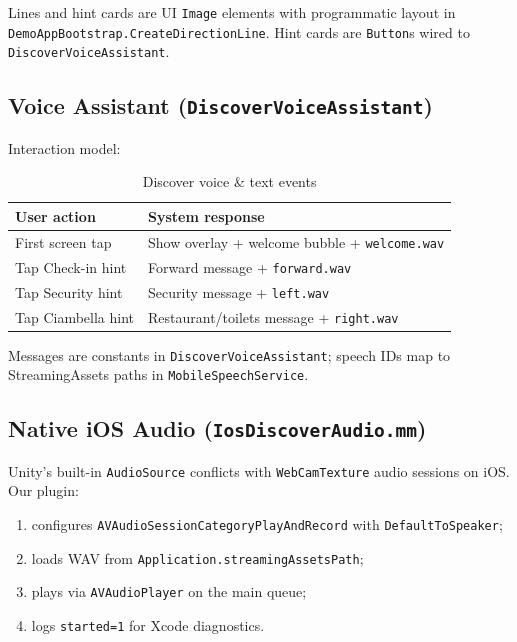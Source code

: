 \documentclass[11pt,a4paper]{article}
\begin{document}
Lines and hint cards are UI \texttt{Image} elements with programmatic layout in \texttt{DemoAppBootstrap.CreateDirectionLine}. Hint cards are \texttt{Button}s wired to \texttt{DiscoverVoiceAssistant}.

\subsection{Voice Assistant (\texttt{DiscoverVoiceAssistant})}

Interaction model:

\begin{table}[H]
\centering
\caption{Discover voice \& text events}
\begin{tabular}{@{}p{3.5cm}p{10cm}@{}}
\toprule
\textbf{User action} & \textbf{System response} \\
\midrule
First screen tap & Show overlay + welcome bubble + \texttt{welcome.wav} \\
Tap Check-in hint & Forward message + \texttt{forward.wav} \\
Tap Security hint & Security message + \texttt{left.wav} \\
Tap Ciambella hint & Restaurant/toilets message + \texttt{right.wav} \\
\bottomrule
\end{tabular}
\end{table}

Messages are constants in \texttt{DiscoverVoiceAssistant}; speech IDs map to StreamingAssets paths in \texttt{MobileSpeechService}.

\subsection{Native iOS Audio (\texttt{IosDiscoverAudio.mm})}

Unity's built-in \texttt{AudioSource} conflicts with \texttt{WebCamTexture} audio sessions on iOS. Our plugin:

\begin{enumerate}[noitemsep]
    \item configures \texttt{AVAudioSessionCategoryPlayAndRecord} with \texttt{DefaultToSpeaker};
    \item loads WAV from \texttt{Application.streamingAssetsPath};
    \item plays via \texttt{AVAudioPlayer} on the main queue;
    \item logs \texttt{started=1} for Xcode diagnostics.
\end{enumerate}
\end{document}
